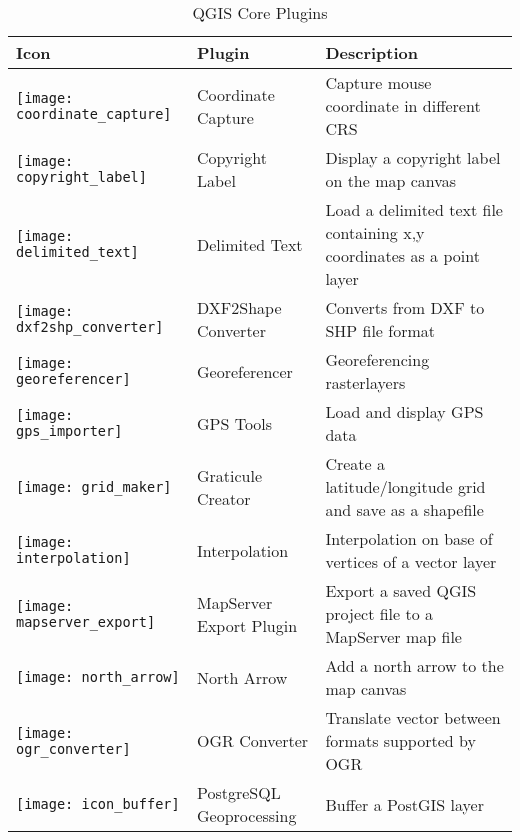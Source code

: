 \begin{minipage}{\textwidth}
\begin{table}[H]
\centering
\caption{QGIS Core Plugins}\label{tab:core_plugins}\medskip
\small
 \begin{tabular}{|l|l|p{4in}|}
\hline \textbf{Icon} & \textbf{Plugin} & \textbf{Description} \\
\hline
\texttt{[image: coordinate\_capture]}
 & Coordinate Capture \index{plugins!coordinate capture}& Capture mouse coordinate in different CRS\\
\hline 
\texttt{[image: copyright\_label]}
 & Copyright Label \index{plugins!copyright}& Display a copyright label on the map canvas\\
\hline 
\texttt{[image: delimited\_text]}
 & Delimited Text \index{plugins!delimited text}& Load a delimited text file 
containing x,y coordinates as a point layer \\
\hline 
\texttt{[image: dxf2shp\_converter]}
 & DXF2Shape Converter \index{plugins!DXF2Shape}& Converts from DXF to SHP file format \\
\hline
\texttt{[image: georeferencer]}
 & Georeferencer \index{plugin!georeferencer} & Georeferencing rasterlayers \\
\hline 
\texttt{[image: gps\_importer]}
 & GPS Tools \index{plugins!gps}& Load and display GPS data \\
\hline
\texttt{[image: grid\_maker]}
 & Graticule Creator \index{plugins!graticule}& Create a latitude/longitude grid and save as a shapefile\\
\hline
\texttt{[image: interpolation]}
& Interpolation \index{plugins!Interpolation}& Interpolation on base of vertices of a vector layer\\
\hline
\texttt{[image: mapserver\_export]}
& MapServer Export Plugin \index{plugins!MapServer Export}& Export a saved QGIS project file to a MapServer map file \\
\hline
\texttt{[image: north\_arrow]}
& North Arrow \index{plugins!north arrow}& Add a north arrow to the map canvas\\
\hline
\texttt{[image: ogr\_converter]}
 & OGR Converter \index{plugins!OGR converter}& Translate vector between formats supported by OGR \\
\hline
\texttt{[image: icon\_buffer]}
 & PostgreSQL Geoprocessing \index{plugins!geoprocessing}& Buffer a PostGIS layer \\

\end{tabular}
\end{table}
\end{minipage}
